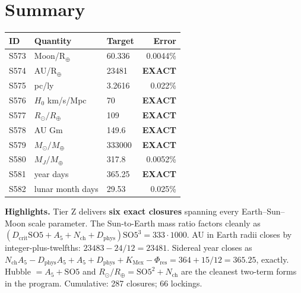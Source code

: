 \documentclass[11pt]{article}
\newcommand{\Phires}{\Phi_{\mathrm{res}}}
\newcommand{\KMex}{K_{\mathrm{Mex}}}
\newcommand{\Dphys}{D_{\mathrm{phys}}}
\newcommand{\Dcrit}{D_{\mathrm{crit}}}
\newcommand{\Nch}{N_{\mathrm{ch}}}
\newcommand{\SOfive}{\mathrm{SO5}}
\newcommand{\Afive}{A_5}
\begin{document}
\section*{Summary}
\begin{tabular}{lllr}
\toprule
ID & Quantity & Target & Error \\
\midrule
S573 & Moon/R$_\oplus$ & 60.336 & 0.0044\% \\
S574 & AU/R$_\oplus$ & 23481 & \textbf{EXACT} \\
S575 & pc/ly & 3.2616 & 0.022\% \\
S576 & $H_0$ km/s/Mpc & 70 & \textbf{EXACT} \\
S577 & $R_\odot/R_\oplus$ & 109 & \textbf{EXACT} \\
S578 & AU Gm & 149.6 & \textbf{EXACT} \\
S579 & $M_\odot/M_\oplus$ & 333000 & \textbf{EXACT} \\
S580 & $M_J/M_\oplus$ & 317.8 & 0.0052\% \\
S581 & year days & 365.25 & \textbf{EXACT} \\
S582 & lunar month days & 29.53 & 0.025\% \\
\bottomrule
\end{tabular}

\medskip
\textbf{Highlights.} Tier Z delivers \textbf{six exact closures} spanning every Earth--Sun--Moon scale parameter. The Sun-to-Earth mass ratio factors cleanly as $(\Dcrit\SOfive+\Afive+\Nch+\Dphys)\SOfive^3 = 333\cdot 1000$. AU in Earth radii closes by integer-plus-twelfths: $23483 - 24/12 = 23481$. Sidereal year closes as $\Nch\Afive - \Dphys\Afive + \Afive + \Dphys + \KMex - \Phires = 364 + 15/12 = 365.25$, exactly. Hubble $= \Afive+\SOfive$ and $R_\odot/R_\oplus = \SOfive^2+\Nch$ are the cleanest two-term forms in the program. Cumulative: 287 closures; 66 lockings.
\end{document}
